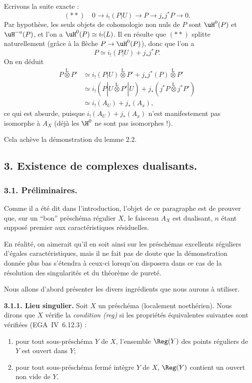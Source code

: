 Ecrivons la suite exacte :
\[
(**) \quad 0 \longrightarrow i_{!}(P|U) \longrightarrow P \longrightarrow j_{*}j^{*}P \longrightarrow 0.
\]
Par hypothèse, les seuls objets de cohomologie non nuls de $P$ sont $\uH^{0}(P)$ et $\uH^{-a}(P)$, et l'on a $\uH^{0}(P) \simeq i_{!}(L)$. Il en résulte que $(**)$ splitte naturellement (grâce à la flèche $P \to \uH^{0}(P)$), donc que l'on a
\[
P \simeq i_{!}(P|U) + j_{*}j^{*}P.
\]
On en déduit
\begin{align*}
P \mathop{\otimes}\limits^{\mathrm{L}} P' &\simeq i_{!}(P|U) \mathop{\otimes}\limits^{\mathrm{L}} P' + j_{*}j^{*}(P) \mathop{\otimes}\limits^{\mathrm{L}} P' \\
&\simeq i_{!}(P|U \mathop{\otimes}\limits^{\mathrm{L}} P'|U) + j_{*}(j^{*}P \mathop{\otimes}\limits^{\mathrm{L}} j^{*}P') \\
&\simeq i_{!}(A_U) + j_{*}(A_x),
\end{align*}
ce qui est absurde, puisque $i_{!}(A_U) + j_{*}(A_x)$ n'est manifestement pas isomorphe à $A_X$ (déjà les $\H^{0}$ ne sont pas isomorphes !).

Cela achève la démonstration du lemme 2.2.

\subsection*{3. Existence de complexes dualisants.}

\subsubsection*{3.1. Préliminaires.}

Comme il a été dit dans l'introduction, l'objet de ce paragraphe est de prouver que, sur un ``bon'' préschéma régulier $X$, le faisceau $A_X$ est dualisant, $n$ étant supposé premier aux caractéristiques résiduelles.

En réalité, on aimerait qu'il en soit ainsi sur les préschémas excellents réguliers d'égales caractéristiques, mais il ne fait pas de doute que la démonstration donnée plus bas s'étendra à ceux-ci lorsqu'on disposera dans ce cas de la résolution des singularités et du théorème de pureté.

Nous allons d'abord présenter les divers ingrédients que nous aurons à utiliser.

\textbf{3.1.1. Lieu singulier.} Soit $X$ un préschéma (localement noethérien). Nous dirons que $X$ vérifie la \emph{condition (reg)} si les propriétés équivalentes suivantes sont vérifiées (EGA~IV~6.12.3) :
\begin{enumerate}
\item[(i)] pour tout sous-préschéma $Y$ de $X$, l'ensemble $\Reg(Y)$ des points réguliers de $Y$ est ouvert dans $Y$;
\item[(ii)] pour tout sous-préschéma fermé intègre $Y$ de $X$, $\Reg(Y)$ contient un ouvert non vide de $Y$.
\end{enumerate}

